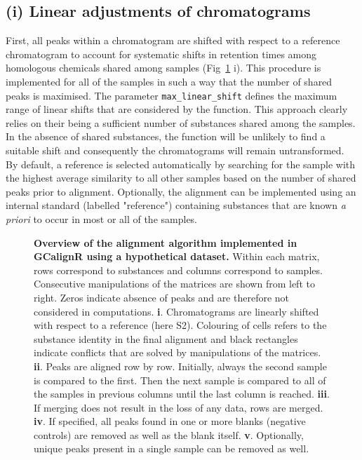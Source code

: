 \documentclass[10pt,letterpaper]{article}
\begin{document}
\subsection*{(i) Linear adjustments of chromatograms}
First, all peaks within a chromatogram are shifted with respect to a reference chromatogram to account for systematic shifts in retention times among homologous chemicals shared among samples (Fig~\ref{Fig:Fig2} i). This procedure is implemented for all of the samples in such a way that the number of shared peaks is maximised. The parameter \texttt{max\_linear\_shift} defines the maximum range of linear shifts that are considered by the function. This approach clearly relies on their being a sufficient number of substances shared among the samples. In the absence of shared substances, the function will be unlikely to find a suitable shift and consequently the chromatograms will remain untransformed. By default, a reference is selected automatically by searching for the sample with the highest average similarity to all other samples based on the number of shared peaks prior to alignment. Optionally, the alignment can be implemented using an internal standard (labelled "reference") containing substances that are known \textit{a priori} to occur in most or all of the samples.

\begin{figure}[htbp]
\centering
\caption{\textbf{Overview of the alignment algorithm implemented in GCalignR using a hypothetical dataset.}
Within each matrix, rows correspond to substances and columns correspond to samples. Consecutive manipulations of the matrices are shown from left to right. Zeros indicate absence of peaks and are therefore not considered in computations. \textbf{i}. Chromatograms are linearly shifted with respect to a reference (here S2). Colouring of cells refers to the substance identity in the final alignment and black rectangles indicate conflicts that are solved by manipulations of the matrices. \textbf{ii}. Peaks are aligned row by row. Initially, always the second sample is compared to the first. Then the next sample is compared to all of the samples in previous columns until the last column is reached. \textbf{iii}. If merging does not result in the loss of any data, rows are merged. \textbf{iv}. If specified, all peaks found in one or more blanks (negative controls) are removed as well as the blank itself. \textbf{v}. Optionally, unique peaks present in a single sample can be removed as well.}
\label{Fig:Fig2}
\end{figure}
\end{document}
